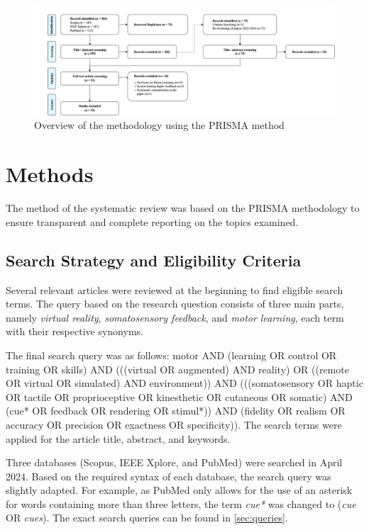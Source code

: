 
\begin{figure}[htbp]
    \centering
    \includegraphics[width=\linewidth]{figures/prisma_overview.png} 
    \caption{Overview of the methodology using the PRISMA method}
    \label{fig:prisma}
\end{figure} 

\section{Methods}

The method of the systematic review was based on the PRISMA methodology \cite{Page2021TheReviews} to ensure transparent and complete reporting on the topics examined.

\subsection{Search Strategy and Eligibility Criteria}
\label{sec:eligibility}
Several relevant articles were reviewed at the beginning to find eligible search terms. The query based on the research question consists of three main parts, namely \textit{virtual reality}, \textit{somatosensory feedback}, and \textit{motor learning}, each term with their respective synonyms. 

The final search query was as follows: motor AND (learning OR control OR training OR skills) AND (((virtual OR augmented) AND reality) OR ((remote OR virtual OR simulated) AND environment)) AND (((somatosensory OR haptic OR tactile OR proprioceptive OR kinesthetic OR cutaneous OR somatic) AND 
(cue* OR feedback OR rendering OR stimul*)) AND (fidelity OR realism OR accuracy OR precision OR exactness OR specificity)). The search terms were applied for the article title, abstract, and keywords.

Three databases (Scopus, IEEE Xplore, and PubMed) were searched in April 2024. Based on the required syntax of each database, the search query was slightly adapted. For example, as PubMed only allows for the use of an asterisk for words containing more than three letters, the term \textit{cue*} was changed to (\textit{cue} OR \textit{cues}). The exact search queries can be found in \ref{sec:queries}. 

